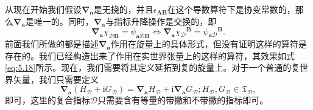 从现在开始我们假设$\boldsymbol{\nabla }_{\boldsymbol{a}}$是无挠的，并且$\epsilon _{\boldsymbol{AB}}$在这个导数算符下是协变常数的，那么$\boldsymbol{\nabla }_{\boldsymbol{a}}$是唯一的。同时，$\boldsymbol{\nabla }_{\boldsymbol{a}}$与指标升降操作是交换的，即
\begin{equation*}
	\boldsymbol{\nabla }_{\boldsymbol{a}} \chi _{\mathcal{D}\boldsymbol{B}} =\psi _{\boldsymbol{a}\mathcal{D}\boldsymbol{B}} \Leftrightarrow \boldsymbol{\nabla }_{\boldsymbol{a}} \chi {_{\mathcal{D}}}^{\boldsymbol{B}} =\psi {_{\boldsymbol{a}\mathcal{D}}}^{\boldsymbol{B}} .
\end{equation*}
前面我们所做的都是描述$\boldsymbol{\nabla }_{\boldsymbol{a}}$作用在旋量上的具体形式，但没有证明这样的算符是存在的。我们已经构造出来了作用在实世界张量上的这样的算符，其效果如式\ref{eq:5.18}所示。现在，我们需要将其定义延拓到复的旋量上。对于一个普通的复世界矢量，我们只需要定义
\begin{equation*}
	\boldsymbol{\nabla }_{\boldsymbol{a}} (H_{\mathcal{D}} +\mathrm{i} G_{\mathcal{D}} )=\boldsymbol{\nabla }_{\boldsymbol{a}} H_{\mathcal{D}} +\mathrm{i}\boldsymbol{\nabla }_{\boldsymbol{a}} G_{\mathcal{D}} ;H_{\mathcal{D}} ,G_{\mathcal{D}} \in \mathfrak{T}_{\mathcal{D}} ,
\end{equation*}
即可，这里的复合指标$\mathcal{D}$只需要含有等量的带撇和不带撇的指标即可。



